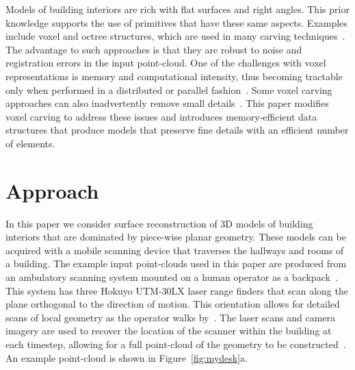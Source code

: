 \documentclass[10pt,twocolumn,letterpaper]{article}
\begin{document}
Models of building interiors are rich with flat surfaces and right angles.  This prior knowledge supports the use of primitives that have these same aspects.  Examples include voxel and octree structures, which are used in many carving techniques~\cite{OctreeSculpting,Carving,SpaceTime,VoxelSurfaceArea,Yang05}.  The advantage to such approaches is that they are robust to noise and registration errors in the input point-cloud.  One of the challenges with voxel representations is memory and computational intensity, thus becoming tractable only when performed in a distributed or parallel fashion~\cite{ParallelOctree}.  Some voxel carving approaches can also inadvertently remove small details~\cite{Carving}.  This paper modifies voxel carving to address these issues and introduces memory-efficient data structures that produce models that preserve fine details with an efficient number of elements.

\section{Approach}
\label{sec:approach}


In this paper we consider surface reconstruction of 3D models of building interiors that are dominated by piece-wise planar geometry.  These models can be acquired with a mobile scanning device that traverses the hallways and rooms of a building.  The example input point-clouds used in this paper are produced from an ambulatory scanning system mounted on a human operator as a backpack~\cite{Backpack}.  This system has three Hokuyo UTM-30LX laser range finders that scan along the plane orthogonal to the direction of motion.  This orientation allows for detailed scans of local geometry as the operator walks by~\cite{Carving,Sweep}.  The laser scans and camera imagery are used to recover the location of the scanner within the building at each timestep, allowing for a full point-cloud of the geometry to be constructed~\cite{Localization}.  An example point-cloud is shown in Figure~\ref{fig:mydesk}a.
\end{document}
